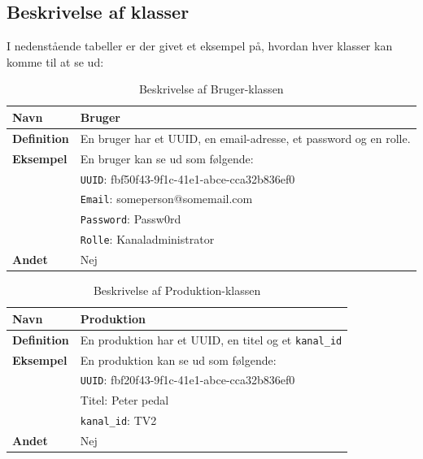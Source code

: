 \subsection{Beskrivelse af klasser}
 I nedenstående tabeller er der givet et eksempel på, hvordan hver klasser kan komme til at se ud:
 
\begin{table}
    \centering
    \begin{tabular}{|p{6cm} | p{10cm} |}
        \hline
        \textbf{Navn} & Bruger\\
        \hline
        \textbf{Definition} &  En bruger har et UUID, en email-adresse, et password og en rolle. \\
        \hline
        \textbf{Eksempel} & En bruger kan se ud som følgende: \\
                          & \texttt{UUID}: fbf50f43-9f1c-41e1-abce-cca32b836ef0 \\
                          & \texttt{Email}: someperson@somemail.com\\
                          & \texttt{Password}: Passw0rd\\
                          & \texttt{Rolle}: Kanaladministrator \\
        \hline
        \textbf{Andet} & Nej\\
        \hline
    \end{tabular}
    \caption{Beskrivelse af Bruger-klassen}
    \label{tab:user_class_description}
\end{table}

\begin{table}
    \centering
    \begin{tabular}{|p{6cm} | p{10cm} |}
        \hline
        \textbf{Navn} & Produktion\\
        \hline
        \textbf{Definition} &  En produktion har et UUID, en titel og et \texttt{kanal\_id}\\
        \hline
        \textbf{Eksempel} & En produktion kan se ud som følgende:\\
                          & \texttt{UUID}: fbf20f43-9f1c-41e1-abce-cca32b836ef0 \\
                          & Titel: Peter pedal \\
                          & \texttt{kanal\_id}: TV2 \\
        \hline
        \textbf{Andet} & Nej\\
        \hline
    \end{tabular}
    \caption{Beskrivelse af Produktion-klassen}
    \label{tab:production_class_description}
\end{table}

